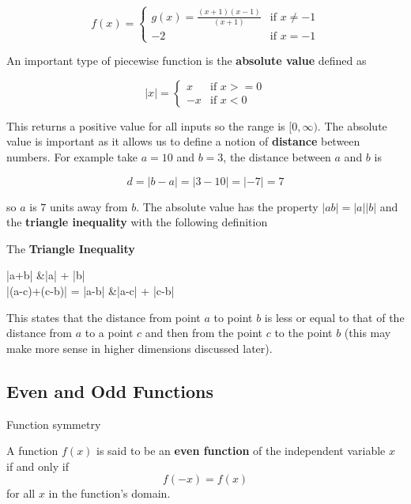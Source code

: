         $$
        f(x) =
        \begin{cases}
            g(x) = \frac{(x+1)(x-1)}{(x+1)} & \text{if } x \neq -1 \\
            -2 & \text{if } x = -1
        \end{cases}
        $$

        An important type of piecewise function is the \textbf{absolute value} defined as

        \begin{equation}
            |x| =
            \begin{cases}
                x & \text{if } x >= 0 \\
                -x & \text{if } x < 0
            \end{cases}
        \end{equation}

        \noindent This returns a positive value for all inputs so the range is $[0,\infty)$. The absolute value is important as it allows us to define a notion of \textbf{distance} between numbers. For example take $a = 10$ and $b = 3$, the distance between $a$ and $b$ is

        \begin{equation}
            d = |b - a| = |3 - 10| = |-7| = 7
        \end{equation}

        \noindent so $a$ is $7$ units away from $b$. The absolute value has the property $|ab| = |a||b|$ and the \textbf{triangle inequality} with the following definition

        \begin{definition}
            The \textbf{Triangle Inequality}

            \begin{aequation}
                |a+b| &\leq |a| + |b| \\
                |(a-c)+(c-b)| = |a-b| &\leq |a-c| + |c-b|
            \end{aequation}
        \end{definition}

        \noindent This states that the distance from point $a$ to point $b$ is less or equal to that of the distance from $a$ to a point $c$ and then from the point $c$ to the point $b$ (this may make more sense in higher dimensions discussed later).

        \subsection{Even and Odd Functions}
        Function symmetry
        \begin{definition}
            A function $f(x)$ is said to be an \textbf{even function} of the independent variable $x$ if and only if
            $$
            f(-x) = f(x)
            $$
            for all $x$ in the function's domain.
        \end{definition}

